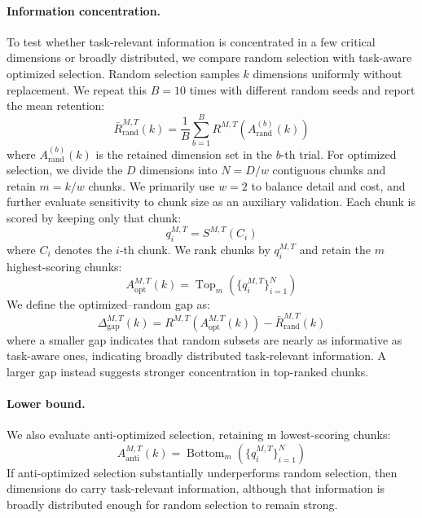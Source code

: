 \documentclass[11pt]{article}
\begin{document}
\paragraph{Information concentration.}
To test whether task-relevant information is concentrated in a few critical dimensions or broadly distributed, we compare random selection with task-aware optimized selection. Random selection samples $k$ dimensions uniformly without replacement. We repeat this $B=10$ times with different random seeds and report the mean retention:
\begin{equation}
\bar{R}_{\mathrm{rand}}^{M,T}(k)
= \frac{1}{B}\sum_{b=1}^{B}R^{M,T}(A_{\mathrm{rand}}^{(b)}(k))
\end{equation}
where $A_{\mathrm{rand}}^{(b)}(k)$ is the retained dimension set in the $b$-th trial.
For optimized selection, we divide the $D$ dimensions into $N=D/w$ contiguous chunks and retain $m=k/w$ chunks. We primarily use $w = 2$ to balance detail and cost, and further evaluate sensitivity to chunk size as an auxiliary validation. Each chunk is scored by keeping only that chunk:
\begin{equation}
q_i^{M,T}=S^{M,T}(C_i)
\end{equation}
where $C_i$ denotes the $i$-th chunk. We rank chunks by $q_i^{M,T}$ and retain the $m$ highest-scoring chunks:
\begin{equation}
A_{\mathrm{opt}}^{M,T}(k)=\operatorname{Top}_{m}\left(\{q_i^{M,T}\}_{i=1}^{N}\right)
\end{equation}
We define the optimized--random gap as:
\begin{equation}
\Delta_{\mathrm{gap}}^{M,T}(k)
=
R^{M,T}(A_{\mathrm{opt}}^{M,T}(k))
-
\bar{R}_{\mathrm{rand}}^{M,T}(k)
\end{equation}
where a smaller gap indicates that random subsets are nearly as informative as task-aware ones, indicating broadly distributed task-relevant information. A larger gap instead suggests stronger concentration in top-ranked chunks.


\paragraph{Lower bound.}
We also evaluate anti-optimized selection, retaining m lowest-scoring chunks:
\begin{equation}
A_{\mathrm{anti}}^{M,T}(k)=\operatorname{Bottom}_{m}\left(\{q_i^{M,T}\}_{i=1}^{N}\right)
\end{equation}
If anti-optimized selection substantially underperforms random selection, then dimensions do carry task-relevant information, although that information is broadly distributed enough for random selection to remain strong.
\end{document}
